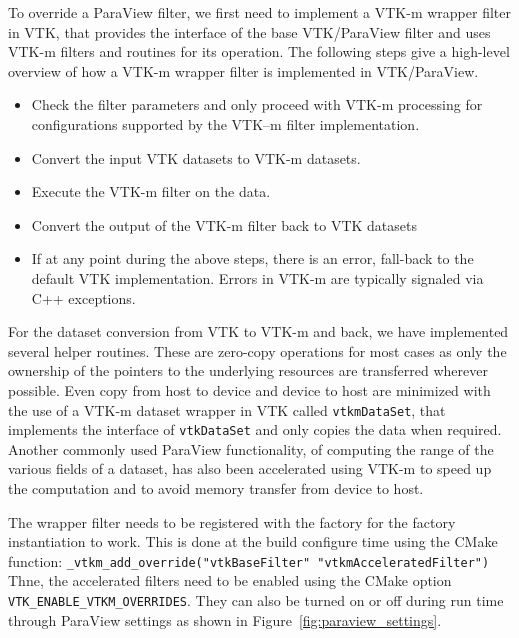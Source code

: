 To override a ParaView filter, we first need to implement a VTK-m wrapper filter in VTK, that provides the interface of the base VTK/ParaView filter and uses VTK-m filters and routines for its operation. The following steps give a high-level overview of how a VTK-m wrapper filter is implemented in VTK/ParaView.
\begin{itemize}
    \item Check the filter parameters and only proceed with VTK-m processing for configurations supported by the VTK–m filter implementation.
    \item Convert the input VTK datasets to VTK-m datasets. 
    \item Execute the VTK-m filter on the data.
    \item Convert the output of the VTK-m filter back to VTK datasets
    \item If at any point during the above steps, there is an error, fall-back to the default VTK implementation. Errors in VTK-m are typically signaled via C++ exceptions.
\end{itemize}

For the dataset conversion from VTK to VTK-m and back, we have implemented several helper routines. These are zero-copy operations for most cases as only the ownership of the pointers to the underlying resources are transferred wherever possible. Even copy from host to device and device to host are minimized with the use of a VTK-m dataset wrapper in VTK called \texttt{vtkmDataSet}, that implements the interface of \texttt{vtkDataSet} and only copies the data when required. Another commonly used ParaView functionality, of computing the range of the various fields of a dataset, has also been accelerated using VTK-m to speed up the computation and to avoid memory transfer from device to host.

The wrapper filter needs to be registered with the factory for the factory instantiation to work. This is done at the build configure time using the CMake function:
\texttt{\_vtkm\_add\_override("vtkBaseFilter" "vtkmAcceleratedFilter")} Thne, the accelerated filters need to be enabled using the CMake option \texttt{VTK\_ENABLE\_VTKM\_OVERRIDES}. They can also be turned on or off during run time through ParaView settings as shown in Figure~\ref{fig:paraview_settings}.

